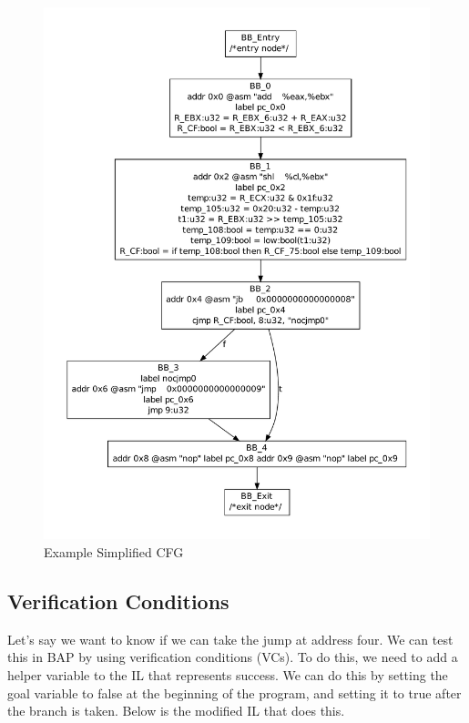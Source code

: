 \begin{figure}[p]
  \begin{center}
    \includegraphics[height=.9\textheight]{chap-examples/cfg_simp.pdf}
  \end{center}
  \caption{Example Simplified CFG}
  \label{fig:cfgsimp}
\end{figure}
\FloatBarrier

\subsection{Verification Conditions}

Let's say we want to know if we can take the jump at address four.  We
can test this in BAP by using verification conditions (VCs).  To do
this, we need to add a helper variable to the IL that represents
success.  We can do this by setting the goal variable to false at the
beginning of the program, and setting it to true after the branch is
taken.  Below is the modified IL that does this.

